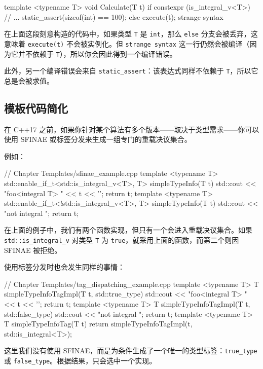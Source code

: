 \begin{codebox}[cpp]
template <typename T>
void Calculate(T t)
{
if constexpr (is_integral_v<T>)
{
// ...
static_assert(sizeof(int) == 100);
}
else
{
execute(t);
strange syntax
}
}
\end{codebox}

在上面这段刻意构造的代码中，如果类型 \texttt{T} 是 \texttt{int}，那么 \texttt{else} 分支会被丢弃，这意味着 \texttt{execute(t)} 不会被实例化。但 \texttt{strange syntax} 这一行仍然会被编译（因为它并不依赖于 \texttt{T}），所以你会因此得到一个编译错误。

此外，另一个编译错误会来自 \texttt{static\_assert}：该表达式同样不依赖于 \texttt{T}，所以它总是会被求值。

\subsection{模板代码简化}

在 C++17 之前，如果你针对某个算法有多个版本——取决于类型需求——你可以使用 SFINAE 或标签分发来生成一组专门的重载决议集合。

例如：

\begin{codebox}[cpp]
// Chapter Templates/sfinae_example.cpp
template <typename T>
std::enable_if_t<std::is_integral_v<T>, T> simpleTypeInfo(T t)
{
std::cout << "foo<integral T> " << t << '\n';
return t;
}
template <typename T>
std::enable_if_t<!std::is_integral_v<T>, T> simpleTypeInfo(T t)
{
std::cout << "not integral \n";
return t;
}
\end{codebox}

在上面的例子中，我们有两个函数实现，但只有一个会进入重载决议集合。如果 \texttt{std::is\_integral\_v} 对类型 \texttt{T} 为 \texttt{true}，就采用上面的函数，而第二个则因 SFINAE 被拒绝。

使用标签分发时也会发生同样的事情：

\begin{codebox}[cpp]
// Chapter Templates/tag_dispatching_example.cpp
template <typename T>
T simpleTypeInfoTagImpl(T t, std::true_type)
{
std::cout << "foo<integral T> " << t << '\n';
return t;
}
template <typename T>
T simpleTypeInfoTagImpl(T t, std::false_type)
{
std::cout << "not integral \n";
return t;
}
template <typename T>
T simpleTypeInfoTag(T t)
{
return simpleTypeInfoTagImpl(t, std::is_integral<T>{});
}
\end{codebox}

这里我们没有使用 SFINAE，而是为条件生成了一个唯一的类型标签：\texttt{true\_type} 或 \texttt{false\_type}。根据结果，只会选中一个实现。

